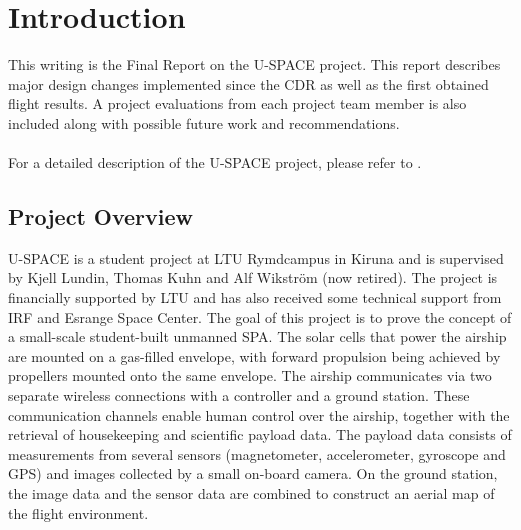 \newpage
\chapter{Introduction}
\label{chap:introduction}
%
This writing is the Final Report on the \ac{U-SPACE} project. This report describes major design changes implemented since the \ac{CDR}\cite{CDR} as well as the first obtained flight results. A project evaluations from each project team member is also included along with possible future work and recommendations.
\\\\
%
For a detailed description of the \ac{U-SPACE} project, please refer to \cite{CDR}.
%
\section{Project Overview}
\ac{U-SPACE} is a student project at \ac{LTU} Rymdcampus in Kiruna and is supervised by Kjell Lundin, Thomas Kuhn and Alf Wikstr\"{o}m (now retired). The project is financially supported by \ac{LTU} and has also received some technical support from \ac{IRF} and Esrange Space Center. The goal of this project is to prove the concept of a small-scale student-built unmanned \ac{SPA}. The solar cells that power the airship are mounted on a gas-filled envelope, with forward propulsion being achieved by propellers mounted onto the same envelope. The airship communicates via two separate wireless connections with a controller and a ground station. These communication channels enable human control over the airship, together with the retrieval of housekeeping and scientific payload data. The payload data consists of measurements from several sensors (magnetometer, accelerometer, gyroscope and \ac{GPS}) and images collected by a small on-board camera. On the ground station, the image data and the sensor data are combined to construct an aerial map of the flight environment.